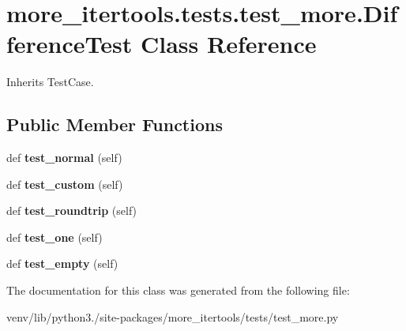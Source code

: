 \hypertarget{classmore__itertools_1_1tests_1_1test__more_1_1_difference_test}{}\section{more\+\_\+itertools.\+tests.\+test\+\_\+more.\+Difference\+Test Class Reference}
\label{classmore__itertools_1_1tests_1_1test__more_1_1_difference_test}


Inherits Test\+Case.

\subsection*{Public Member Functions}
\begin{DoxyCompactItemize}
\item 
\mbox{\label{classmore__itertools_1_1tests_1_1test__more_1_1_difference_test_a8e0e0fc0e80b70743d6082db10fc1547}} 
def {\bfseries test\+\_\+normal} (self)
\item 
\mbox{\label{classmore__itertools_1_1tests_1_1test__more_1_1_difference_test_a8d57b35f43d3de21940766d071362f94}} 
def {\bfseries test\+\_\+custom} (self)
\item 
\mbox{\label{classmore__itertools_1_1tests_1_1test__more_1_1_difference_test_a384801e0a32d7eaa769ce0472cbbcee9}} 
def {\bfseries test\+\_\+roundtrip} (self)
\item 
\mbox{\label{classmore__itertools_1_1tests_1_1test__more_1_1_difference_test_a32d4aa9616df5fadc09f7b1da2b6b7d3}} 
def {\bfseries test\+\_\+one} (self)
\item 
\mbox{\label{classmore__itertools_1_1tests_1_1test__more_1_1_difference_test_a9d2375c3e2c0577abdd5f9fc033091d8}} 
def {\bfseries test\+\_\+empty} (self)
\end{DoxyCompactItemize}


The documentation for this class was generated from the following file\+:\begin{DoxyCompactItemize}
\item 
venv/lib/python3./site-\/packages/more\+\_\+itertools/tests/test\+\_\+more.\+py\end{DoxyCompactItemize}
